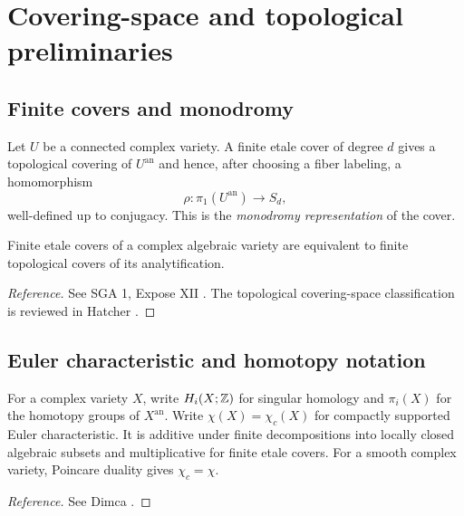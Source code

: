 \section{Covering-space and topological preliminaries}\label{sec:topological-prelim}

\subsection{Finite covers and monodromy}

\begin{definition}\label{def:monodromy}
Let $U$ be a connected complex variety.  A finite etale cover of degree $d$ gives a topological covering of $U^{\mathrm{an}}$ and hence, after choosing a fiber labeling, a homomorphism
\[
  \rho\colon\pi_1(U^{\mathrm{an}})\longrightarrow S_d,
\]
well-defined up to conjugacy.  This is the \emph{monodromy representation} of the cover.
\end{definition}

\begin{recalledtheorem}\label{thm:riemann-existence}
Finite etale covers of a complex algebraic variety are equivalent to finite topological covers of its analytification.
\end{recalledtheorem}

\begin{proof}[Reference]
See SGA 1, Expose XII \cite{SGA1}.  The topological covering-space classification is reviewed in Hatcher \cite[Section 1.3]{Hatcher2002}.
\end{proof}

\subsection{Euler characteristic and homotopy notation}

\begin{definition}\label{def:topological-conventions}
For a complex variety $X$, write $H_i(X;\mathbb Z)$ for singular homology and $\pi_i(X)$ for the homotopy groups of $X^{\mathrm{an}}$.  Write $\chi(X)=\chi_c(X)$ for compactly supported Euler characteristic.  It is additive under finite decompositions into locally closed algebraic subsets and multiplicative for finite etale covers.  For a smooth complex variety, Poincare duality gives $\chi_c=\chi$.
\end{definition}

\begin{proof}[Reference]
See Dimca \cite[Chapter 4]{Dimca2004}.
\end{proof}

